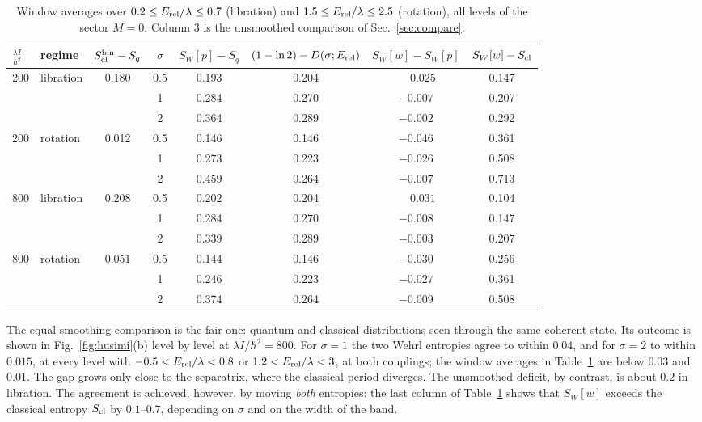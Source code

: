 \documentclass[preprint,12pt]{elsarticle}
\newcommand{\Erel}{E_{\rm rel}}
\newcommand{\Scl}{S_{\rm cl}}
\newcommand{\SW}{S_{W}}
\begin{document}
\begin{table}[t]
\centering
\caption{Window averages over $0.2\le\Erel/\lambda\le0.7$ (libration) and
$1.5\le\Erel/\lambda\le2.5$ (rotation), all levels of the sector $M=0$.
Column 3 is the unsmoothed comparison of Sec.~\ref{sec:compare}.}
\label{tab:husimi_gen}
\footnotesize
\setlength{\tabcolsep}{4pt}
\renewcommand{\arraystretch}{1.12}
\begin{tabular}{llc c cccc}
\toprule
$\frac{\lambda I}{\hbar^{2}}$ & regime & $\Scl^{\rm bin}-S_{q}$ & $\sigma$ &
$\SW[p]-S_{q}$ & $(1-\ln2)-D(\sigma;\Erel)$ & $\SW[w]-\SW[p]$ & $\SW[w]-\Scl$\\
\midrule
200 & libration & 0.180 & 0.5 & 0.193 & 0.204 & $\phantom{-}0.025$ & 0.147\\
    &           &       & 1   & 0.284 & 0.270 & $-0.007$ & 0.207\\
    &           &       & 2   & 0.364 & 0.289 & $-0.002$ & 0.292\\
\midrule
200 & rotation  & 0.012 & 0.5 & 0.146 & 0.146 & $-0.046$ & 0.361\\
    &           &       & 1   & 0.273 & 0.223 & $-0.026$ & 0.508\\
    &           &       & 2   & 0.459 & 0.264 & $-0.007$ & 0.713\\
\midrule
800 & libration & 0.208 & 0.5 & 0.202 & 0.204 & $\phantom{-}0.031$ & 0.104\\
    &           &       & 1   & 0.284 & 0.270 & $-0.008$ & 0.147\\
    &           &       & 2   & 0.339 & 0.289 & $-0.003$ & 0.207\\
\midrule
800 & rotation  & 0.051 & 0.5 & 0.144 & 0.146 & $-0.030$ & 0.256\\
    &           &       & 1   & 0.246 & 0.223 & $-0.027$ & 0.361\\
    &           &       & 2   & 0.374 & 0.264 & $-0.009$ & 0.508\\
\bottomrule
\end{tabular}
\end{table}

The equal-smoothing comparison is the fair one: quantum and classical
distributions seen through the same coherent state. Its outcome is shown in
Fig.~\ref{fig:husimi}(b) level by level at $\lambda I/\hbar^{2}=800$. For
$\sigma=1$ the two Wehrl entropies agree to within $0.04$, and for $\sigma=2$ to
within $0.015$, at every level with $-0.5<\Erel/\lambda<0.8$ or
$1.2<\Erel/\lambda<3$, at both couplings; the window averages in
Table~\ref{tab:husimi_gen} are below $0.03$ and $0.01$. The gap grows only close
to the separatrix, where the classical period diverges. The unsmoothed deficit,
by contrast, is about $0.2$ in libration. The agreement is achieved, however, by moving \emph{both} entropies:
the last column of Table~\ref{tab:husimi_gen} shows that $\SW[w]$ exceeds the
classical entropy $\Scl$ by $0.1$--$0.7$, depending on $\sigma$ and on the
width of the band.
\end{document}
